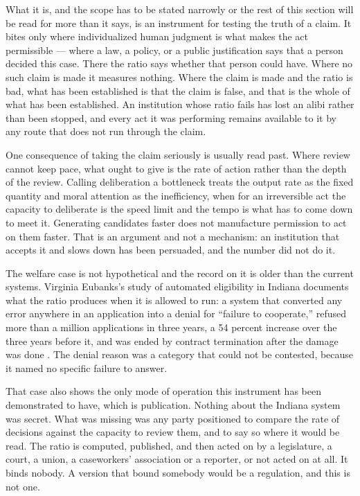 What it is, and the scope has to be stated narrowly or the rest of this section will be read for more than it says, is an instrument for testing the truth of a claim. It bites only where individualized human judgment is what makes the act permissible — where a law, a policy, or a public justification says that a person decided this case. There the ratio says whether that person could have. Where no such claim is made it measures nothing. Where the claim is made and the ratio is bad, what has been established is that the claim is false, and that is the whole of what has been established. An institution whose ratio fails has lost an alibi rather than been stopped, and every act it was performing remains available to it by any route that does not run through the claim.

One consequence of taking the claim seriously is usually read past. Where review cannot keep pace, what ought to give is the rate of action rather than the depth of the review. Calling deliberation a bottleneck treats the output rate as the fixed quantity and moral attention as the inefficiency, when for an irreversible act the capacity to deliberate is the speed limit and the tempo is what has to come down to meet it. Generating candidates faster does not manufacture permission to act on them faster. That is an argument and not a mechanism: an institution that accepts it and slows down has been persuaded, and the number did not do it.

The welfare case is not hypothetical and the record on it is older than the current systems. Virginia Eubanks's study of automated eligibility in Indiana documents what the ratio produces when it is allowed to run: a system that converted any error anywhere in an application into a denial for “failure to cooperate,” refused more than a million applications in three years, a 54 percent increase over the three years before it, and was ended by contract termination after the damage was done \autocite{eubanks2018automating}. The denial reason was a category that could not be contested, because it named no specific failure to answer.

That case also shows the only mode of operation this instrument has been demonstrated to have, which is publication. Nothing about the Indiana system was secret. What was missing was any party positioned to compare the rate of decisions against the capacity to review them, and to say so where it would be read. The ratio is computed, published, and then acted on by a legislature, a court, a union, a caseworkers' association or a reporter, or not acted on at all. It binds nobody. A version that bound somebody would be a regulation, and this is not one.

